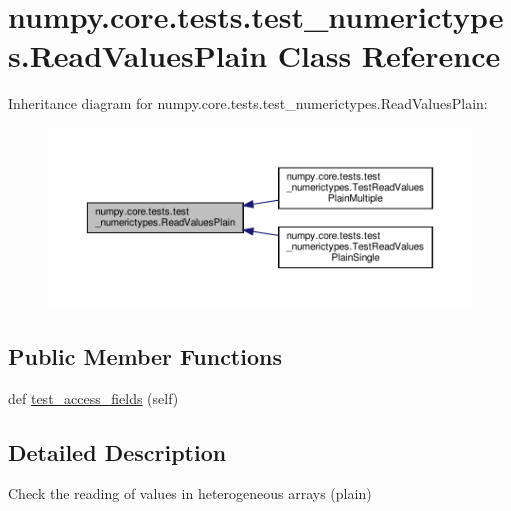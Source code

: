 \hypertarget{classnumpy_1_1core_1_1tests_1_1test__numerictypes_1_1ReadValuesPlain}{}\section{numpy.\+core.\+tests.\+test\+\_\+numerictypes.\+Read\+Values\+Plain Class Reference}
\label{classnumpy_1_1core_1_1tests_1_1test__numerictypes_1_1ReadValuesPlain}


Inheritance diagram for numpy.\+core.\+tests.\+test\+\_\+numerictypes.\+Read\+Values\+Plain\+:
\nopagebreak
\begin{figure}[H]
\begin{center}
\leavevmode
\includegraphics[width=350pt]{classnumpy_1_1core_1_1tests_1_1test__numerictypes_1_1ReadValuesPlain__inherit__graph}
\end{center}
\end{figure}
\subsection*{Public Member Functions}
\begin{DoxyCompactItemize}
\item 
def \hyperlink{classnumpy_1_1core_1_1tests_1_1test__numerictypes_1_1ReadValuesPlain_a73b926e899f7aae596067c37988e35f7}{test\+\_\+access\+\_\+fields} (self)
\end{DoxyCompactItemize}


\subsection{Detailed Description}
\begin{DoxyVerb}Check the reading of values in heterogeneous arrays (plain)\end{DoxyVerb}
 

